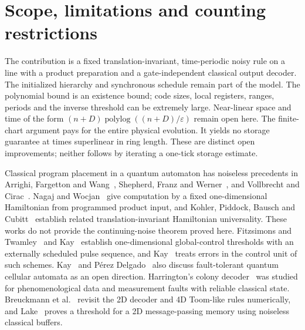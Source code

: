 \section{Scope, limitations and counting restrictions}\label{sec:discussion}
The contribution is a fixed translation-invariant, time-periodic noisy rule on a line with a product preparation and a gate-independent classical output decoder. The initialized hierarchy and synchronous schedule remain part of the model. The polynomial bound is an existence bound; code sizes, local registers, ranges, periods and the inverse threshold can be extremely large. Near-linear space and time of the form $(n+D)\operatorname{polylog}((n+D)/\varepsilon)$ remain open here. The finite-chart argument pays for the entire physical evolution. It yields no storage guarantee at times superlinear in ring length. These are distinct open improvements; neither follows by iterating a one-tick storage estimate.

Classical program placement in a quantum automaton has noiseless precedents in Arrighi, Fargetton and Wang~\cite{AFW2009}, Shepherd, Franz and Werner~\cite{SFW2006}, and Vollbrecht and Cirac~\cite{VC2006,VC2008}. Nagaj and Wocjan~\cite{NW2008} give computation by a fixed one-dimensional Hamiltonian from programmed product input, and Kohler, Piddock, Bausch and Cubitt~\cite{KPBC2022} establish related translation-invariant Hamiltonian universality. These works do not provide the continuing-noise theorem proved here. Fitzsimons and Twamley~\cite{FT2007} and Kay~\cite{Kay2007} establish one-dimensional global-control thresholds with an externally scheduled pulse sequence, and Kay~\cite{Kay2005} treats errors in the control unit of such schemes. Kay~\cite{Kay2007} and P\'erez Delgado~\cite{PerezDelgado2007} also discuss fault-tolerant quantum cellular automata as an open direction. Harrington's colony decoder~\cite[Chapter~5]{Harrington2004} was studied for phenomenological data and measurement faults with reliable classical state. Breuckmann et al.~\cite{BDMT2017} revisit the 2D decoder and 4D Toom-like rules numerically, and Lake~\cite{Lake2025} proves a threshold for a 2D message-passing memory using noiseless classical buffers.

